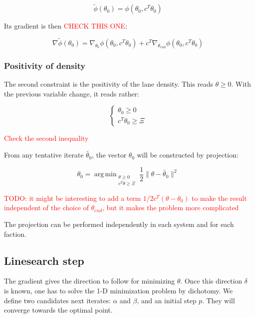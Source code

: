 \documentclass[11pt,a4paper]{article}		%
\DeclareMathOperator*{\argmin}{arg\, min}
\begin{document}
\begin{equation}
\tilde{\phi}(\theta_0) = \phi(\theta_0,c^T\theta_0)
\end{equation}

Its gradient is then \textcolor{red}{CHECK THIS ONE}:

\begin{equation}
\nabla\tilde{\phi}(\theta_0) = \nabla_{\theta_0}\phi(\theta_0,c^T\theta_0) + c^T\nabla_{\theta_{end}}\phi(\theta_0,c^T\theta_0)
\end{equation}

\subsubsection{Positivity of density} \label{sect:pos}

The second constraint is the positivity of the lane density. This reads $\theta\geqslant0$. With the previous variable change, it reads rather:

\begin{equation}
\begin{cases}
	\theta_0 \geqslant 0\\
	c^T\theta_0 \geqslant \Xi
\end{cases}
\end{equation}

\textcolor{red}{Check the second inequality}

From any tentative iterate $\tilde{\theta_0}$, the vector $\theta_0$ will be constructed by projection: 

\begin{equation}
\theta_0 = \argmin_{\substack{\theta \geqslant 0\\c^T\theta \geqslant \Xi}} \dfrac{1}{2}\|\theta-\tilde{\theta_0}\|^2
\end{equation}

\textcolor{red}{TODO: it might be interesting to add a term $1/2 c^T(\theta-\theta_0)$ to make the result independent of the choice of $\theta_{end}$, but it makes the problem more complicated}

The projection can be performed independently in each system and for each faction.

\subsection{Linesearch step}

The gradient gives the direction to follow for minimizing $\theta$. Once this direction $\delta$ is known, one has to solve the 1-D minimization problem by dichotomy. We define two candidates next iterates: $\alpha$ and $\beta$, and an initial step $p$. They will converge towards the optimal point.
\end{document}
